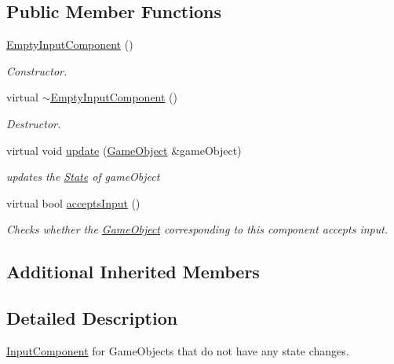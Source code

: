 \subsection*{Public Member Functions}
\begin{DoxyCompactItemize}
\item 
\hypertarget{classEmptyInputComponent_a0d3cf59ff63535b73cdb90ce5764fde6}{\hyperlink{classEmptyInputComponent_a0d3cf59ff63535b73cdb90ce5764fde6}{Empty\-Input\-Component} ()}\label{classEmptyInputComponent_a0d3cf59ff63535b73cdb90ce5764fde6}

\begin{DoxyCompactList}\small\item\em Constructor. \end{DoxyCompactList}\item 
\hypertarget{classEmptyInputComponent_acf04a0a5e842522490a3f8ac05b8f896}{virtual \hyperlink{classEmptyInputComponent_acf04a0a5e842522490a3f8ac05b8f896}{$\sim$\-Empty\-Input\-Component} ()}\label{classEmptyInputComponent_acf04a0a5e842522490a3f8ac05b8f896}

\begin{DoxyCompactList}\small\item\em Destructor. \end{DoxyCompactList}\item 
virtual void \hyperlink{classEmptyInputComponent_a5e11b3048e027761e465072cda02a034}{update} (\hyperlink{classGameObject}{Game\-Object} \&game\-Object)
\begin{DoxyCompactList}\small\item\em updates the \hyperlink{classState}{State} of game\-Object \end{DoxyCompactList}\item 
virtual bool \hyperlink{classEmptyInputComponent_a821f567bd824806e2322f22ce5955b06}{accepts\-Input} ()
\begin{DoxyCompactList}\small\item\em Checks whether the \hyperlink{classGameObject}{Game\-Object} corresponding to this component accepts input. \end{DoxyCompactList}\end{DoxyCompactItemize}
\subsection*{Additional Inherited Members}


\subsection{Detailed Description}
\hyperlink{classInputComponent}{Input\-Component} for Game\-Objects that do not have any state changes. 

